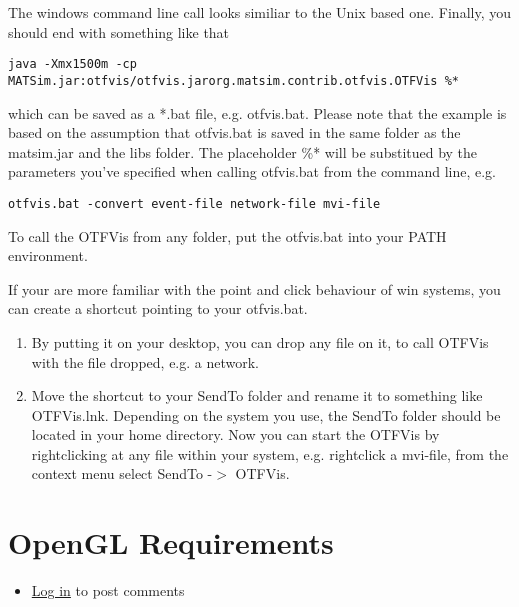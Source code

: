 \documentclass[a4paper,11pt]{report}
\begin{document}
The windows command line call looks similiar to the Unix based one. Finally, you should end with something like that
\begin{verbatim}
java -Xmx1500m -cp MATSim.jar:otfvis/otfvis.jarorg.matsim.contrib.otfvis.OTFVis %*
\end{verbatim}

which can be saved as a *.bat file, e.g. otfvis.bat. Please note that  the example is based on the assumption that otfvis.bat is saved in the  same folder as the matsim.jar and the libs folder. The placeholder \%*  will be substitued by the parameters you've specified when calling  otfvis.bat from the command line, e.g.
\begin{verbatim}
otfvis.bat -convert event-file network-file mvi-file
\end{verbatim}

To call the OTFVis from any folder, put the otfvis.bat into your PATH environment.

If your are more familiar with the point and click behaviour of win  systems, you can create a shortcut pointing to your otfvis.bat.
\begin{enumerate}

	\item By putting it on your desktop, you can drop any file on it, to call OTFVis with the file dropped, e.g. a network.

	\item 
Move  the shortcut to your SendTo folder and rename it to something like  OTFVis.lnk. Depending on the system you use, the SendTo folder should be  located in your home directory. Now you can start the OTFVis by  rightclicking at any file within your system, e.g. rightclick a  mvi-file, from the context menu select SendTo -$>$ OTFVis.


\end{enumerate}



\vfill\eject
\section{OpenGL Requirements}
\begin{itemize}
	\item \href{http://www.matsim.org/user/login?destination=comment/reply/694%23comment-form}{Log in} to post comments
\end{itemize}
\end{document}
